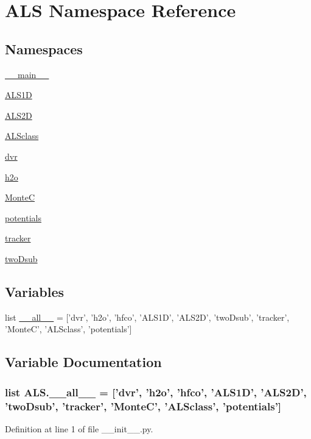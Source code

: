 \hypertarget{namespace_a_l_s}{\section{A\+L\+S Namespace Reference}
\label{namespace_a_l_s}
}
\subsection*{Namespaces}
\begin{DoxyCompactItemize}
\item 
 \hyperlink{namespace_a_l_s_1_1____main____}{\+\_\+\+\_\+main\+\_\+\+\_\+}
\item 
 \hyperlink{namespace_a_l_s_1_1_a_l_s1_d}{A\+L\+S1\+D}
\item 
 \hyperlink{namespace_a_l_s_1_1_a_l_s2_d}{A\+L\+S2\+D}
\item 
 \hyperlink{namespace_a_l_s_1_1_a_l_sclass}{A\+L\+Sclass}
\item 
 \hyperlink{namespace_a_l_s_1_1dvr}{dvr}
\item 
 \hyperlink{namespace_a_l_s_1_1h2o}{h2o}
\item 
 \hyperlink{namespace_a_l_s_1_1_monte_c}{Monte\+C}
\item 
 \hyperlink{namespace_a_l_s_1_1potentials}{potentials}
\item 
 \hyperlink{namespace_a_l_s_1_1tracker}{tracker}
\item 
 \hyperlink{namespace_a_l_s_1_1two_dsub}{two\+Dsub}
\end{DoxyCompactItemize}
\subsection*{Variables}
\begin{DoxyCompactItemize}
\item 
list \hyperlink{namespace_a_l_s_a402c04b28c50c5a47373456a7a2fcee8}{\+\_\+\+\_\+all\+\_\+\+\_\+} = \mbox{[}'dvr', 'h2o', 'hfco', 'A\+L\+S1\+D', 'A\+L\+S2\+D', 'two\+Dsub', 'tracker', 'Monte\+C', 'A\+L\+Sclass', 'potentials'\mbox{]}
\end{DoxyCompactItemize}


\subsection{Variable Documentation}
\hypertarget{namespace_a_l_s_a402c04b28c50c5a47373456a7a2fcee8}{
\subsubsection[{\+\_\+\+\_\+all\+\_\+\+\_\+}]{\setlength{\rightskip}{0pt plus 5cm}list A\+L\+S.\+\_\+\+\_\+all\+\_\+\+\_\+ = \mbox{[}'dvr', 'h2o', 'hfco', 'A\+L\+S1\+D', 'A\+L\+S2\+D', 'two\+Dsub', 'tracker', 'Monte\+C', 'A\+L\+Sclass', 'potentials'\mbox{]}}}\label{namespace_a_l_s_a402c04b28c50c5a47373456a7a2fcee8}


Definition at line 1 of file \+\_\+\+\_\+init\+\_\+\+\_\+.\+py.

